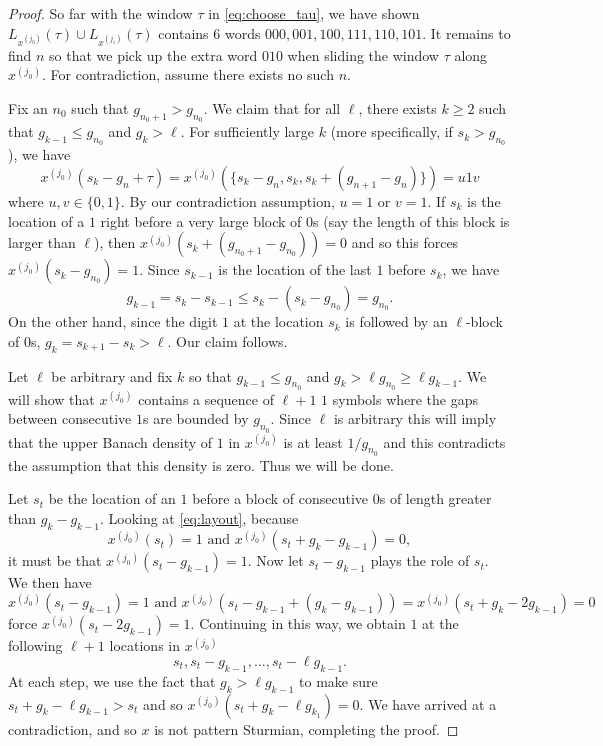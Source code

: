 \documentclass[11pt,reqno]{amsart}
\theoremstyle{definition}
\theoremstyle{plain}
\begin{document}
\begin{proof}
So far with the window $\tau$ in \eqref{eq:choose_tau}, we have shown $L_{x^{(j_0)}}(\tau) \cup L_{x^{(j_1)}}(\tau)$ contains $6$ words $000, 001, 100, 111, 110, 101$. It remains to find $n$ so that we pick up the extra word $010$ when sliding the window $\tau$ along $x^{(j_0)}$. For contradiction, assume there exists no such $n$. 

Fix an $n_0$ such that $g_{n_0+1} > g_{n_0}$. We claim that for all $\ell$, there exists $k \geq 2$ such that $g_{k-1} \leq g_{n_0}$ and $g_{k} > \ell$. For sufficiently large $k$ (more specifically, if $s_k > g_{n_0}$), we have
\begin{equation}\label{eq:layout}
    x^{(j_0)}(s_k - g_n + \tau) = x^{(j_0)}(\{s_k - g_n, s_k, s_k + (g_{n+1} - g_{n})\}) = u1v
\end{equation}
where $u, v \in \{0, 1\}$. By our contradiction assumption, $u = 1$ or $v = 1$. If $s_k$ is the location of a $1$ right before a very large block of $0$s (say the length of this block is larger than $\ell$), then $x^{(j_0)}(s_k + (g_{n_0+1} - g_{n_0})) = 0$ and so this forces $x^{(j_0)}(s_k - g_{n_0}) = 1$. Since $s_{k-1}$ is the location of the last $1$ before $s_k$, we have 
\[
    g_{k-1} = s_k - s_{k-1} \leq s_k - (s_k - g_{n_0}) = g_{n_0}.
\]
On the other hand, since the digit $1$ at the location $s_k$ is followed by an $\ell$-block of $0$s, $g_k = s_{k+1} - s_k > \ell$. Our claim follows.


Let $\ell$ be arbitrary and fix $k$ so that $g_{k-1} \leq g_{n_0}$ and $g_k > \ell g_{n_0} \geq \ell g_{k-1}$.
We will show that $x^{(j_0)}$ contains a sequence of $\ell + 1$ $1$ symbols where the gaps between consecutive $1$s are bounded by $g_{n_0}$. Since $\ell$ is arbitrary this will imply that the upper Banach density of $1$ in $x^{(j_0)}$ is at least $1/g_{n_0}$ and this contradicts the assumption that this density is zero. Thus we will be done. 


Let $s_t$ be the location of an $1$ before a block of consecutive $0$s of length greater than $g_k - g_{k-1}$.
Looking at \eqref{eq:layout}, because 
\[
    x^{(j_0)}(s_t) = 1 \text{ and } x^{(j_0)}(s_t + g_{k} - g_{k-1}) = 0,
\]
it must be that $x^{(j_0)}(s_t - g_{k-1}) = 1$. Now let $s_t - g_{k-1}$ plays the role of $s_t$. We then have 
\[
    x^{(j_0)}(s_t - g_{k-1}) = 1 \text{ and } x^{(j_0)}(s_t - g_{k-1} + (g_k - g_{k-1}))= x^{(j_0)}(s_t + g_k - 2 g_{k-1}) = 0
\]
force $x^{(j_0)}(s_t - 2 g_{k-1}) = 1$. Continuing in this way, we obtain $1$ at the following $\ell + 1$ locations in $x^{(j_0)}$
\[
    s_t, s_t - g_{k-1}, \ldots, s_t - \ell g_{k-1}.
\]
At each step, we use the fact that $g_k > \ell g_{k-1}$ to make sure $s_t + g_k - \ell g_{k-1} > s_t$ and so $x^{(j_0)}(s_t + g_k - \ell g_{k_1}) = 0$. We have arrived at a contradiction, and so $x$ is not pattern Sturmian, completing the proof.
\end{proof}
\end{document}
